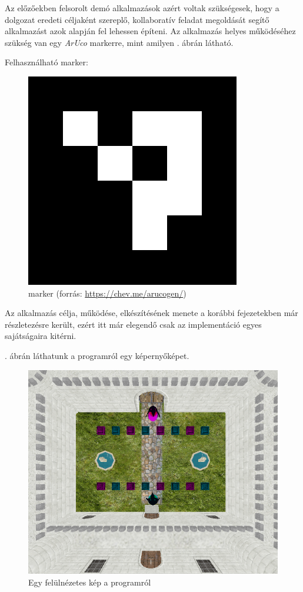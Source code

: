 
Az előzőekben felsorolt demó alkalmazások azért voltak szükségesek, hogy a dolgozat eredeti céljaként szereplő, kollaboratív feladat megoldását segítő alkalmazást azok alapján fel lehessen építeni.
Az alkalmazás helyes működéséhez szükség van egy \textit{ArUco} markerre, mint amilyen . ábrán látható.

Felhasználható marker: 
\begin{figure}[htp]
	\centering
	\includegraphics[scale=0.5]{images/marker.png}
	\caption{marker (forrás: \url{https://chev.me/arucogen/})}
	\label{fig:marker}
\end{figure}

Az alkalmazás célja, működése, elkészítésének menete a korábbi fejezetekben már részletezésre került, ezért itt már elegendő csak az implementáció egyes sajátságaira kitérni.

. ábrán láthatunk a programról egy képernyőképet.

\begin{figure}[htp]
	\centering
	\includegraphics[scale=0.7]{images/game.png}
	\caption{Egy felülnézetes kép a programról}
	\label{fig:game}
\end{figure}

